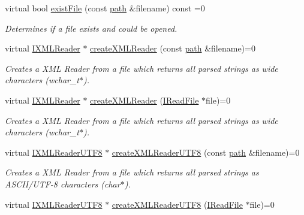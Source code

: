 \begin{DoxyCompactItemize}
virtual bool \hyperlink{classirr_1_1io_1_1IFileSystem_a1c5e98bc16e38b1d15b44e24b1b3bd32}{exist\+File} (const \hyperlink{namespaceirr_1_1io_ab1bdc45edb3f94d8319c02bc0f840ee1}{path} \&filename) const =0
\begin{DoxyCompactList}\small\item\em Determines if a file exists and could be opened. \end{DoxyCompactList}\item 
virtual \hyperlink{namespaceirr_1_1io_a9dc6291fb7e4c73155a3e3c8339f9bff}{I\+X\+M\+L\+Reader} $\ast$ \hyperlink{classirr_1_1io_1_1IFileSystem_a167c9fa159d16ee5c56c074636b0865e}{create\+X\+M\+L\+Reader} (const \hyperlink{namespaceirr_1_1io_ab1bdc45edb3f94d8319c02bc0f840ee1}{path} \&filename)=0
\begin{DoxyCompactList}\small\item\em Creates a X\+ML Reader from a file which returns all parsed strings as wide characters (wchar\+\_\+t$\ast$). \end{DoxyCompactList}\item 
virtual \hyperlink{namespaceirr_1_1io_a9dc6291fb7e4c73155a3e3c8339f9bff}{I\+X\+M\+L\+Reader} $\ast$ \hyperlink{classirr_1_1io_1_1IFileSystem_a38f4c90db3fd1b21473ce0cd2437bb59}{create\+X\+M\+L\+Reader} (\hyperlink{classirr_1_1io_1_1IReadFile}{I\+Read\+File} $\ast$file)=0
\begin{DoxyCompactList}\small\item\em Creates a X\+ML Reader from a file which returns all parsed strings as wide characters (wchar\+\_\+t$\ast$). \end{DoxyCompactList}\item 
virtual \hyperlink{namespaceirr_1_1io_a2dedc8156931082e6b147b562195e310}{I\+X\+M\+L\+Reader\+U\+T\+F8} $\ast$ \hyperlink{classirr_1_1io_1_1IFileSystem_affd8f622ac7c3dcd507f20f9cd23b21f}{create\+X\+M\+L\+Reader\+U\+T\+F8} (const \hyperlink{namespaceirr_1_1io_ab1bdc45edb3f94d8319c02bc0f840ee1}{path} \&filename)=0
\begin{DoxyCompactList}\small\item\em Creates a X\+ML Reader from a file which returns all parsed strings as A\+S\+C\+I\+I/\+U\+T\+F-\/8 characters (char$\ast$). \end{DoxyCompactList}\item 
virtual \hyperlink{namespaceirr_1_1io_a2dedc8156931082e6b147b562195e310}{I\+X\+M\+L\+Reader\+U\+T\+F8} $\ast$ \hyperlink{classirr_1_1io_1_1IFileSystem_acda42a761d3b2fb4d39ad1d9e2ada973}{create\+X\+M\+L\+Reader\+U\+T\+F8} (\hyperlink{classirr_1_1io_1_1IReadFile}{I\+Read\+File} $\ast$file)=0

\end{DoxyCompactItemize}

